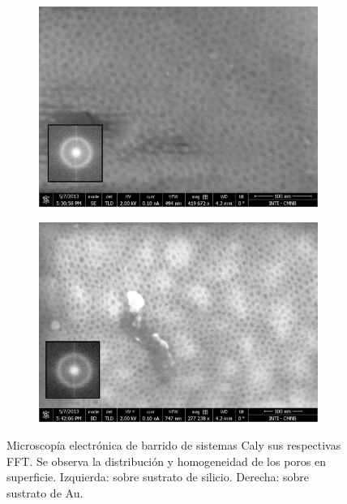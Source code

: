 			\begin{figure}[b!]
		 	   	    \begin{subfigure}[t]{0.49\textwidth}
			        	\includegraphics[width=\textwidth]{Imagenes/F127_Si_sup.jpg}
			       		\end{subfigure}
					\begin{subfigure}[t]{0.49\textwidth}
			 	   	    \includegraphics[width=\textwidth]{Imagenes/F127_Au_sup.jpg}
			       		\end{subfigure}
					\caption[MEB arreglo poroso para \pdmF\space sobre Si y Au.]{Microscopía electrónica de barrido de sistemas Cal\pdmF\space y sus respectivas FFT. Se observa la distribución y homogeneidad de los poros en superficie. Izquierda: sobre sustrato de silicio. Derecha: sobre sustrato de Au.}	 
					 \label{fig:F127_Si_Au}
					 \end{figure}

